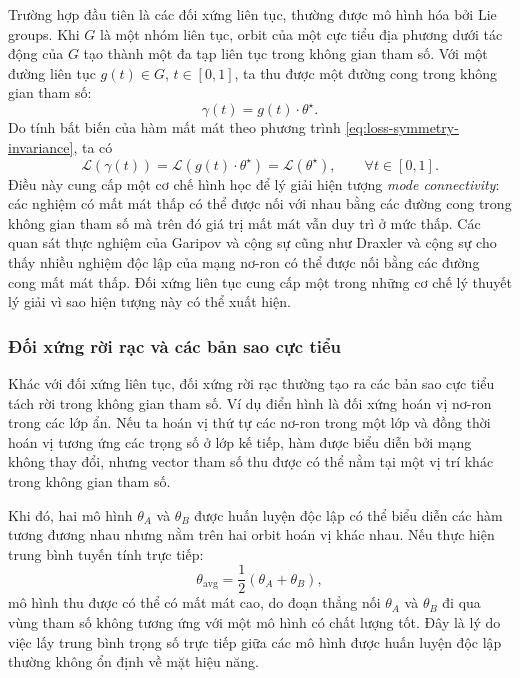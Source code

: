 Trường hợp đầu tiên là các đối xứng liên tục, thường được mô hình hóa bởi Lie groups. Khi $G$ là một nhóm liên tục, orbit của một cực tiểu địa phương dưới tác động của $G$ tạo thành một đa tạp liên tục trong không gian tham số. Với một đường liên tục $g(t) \in G$, $t \in [0,1]$, ta thu được một đường cong trong không gian tham số:
\begin{equation}
    \gamma(t) = g(t) \cdot \theta^\star.
    \label{eq:continuous-symmetry-path}
\end{equation}
Do tính bất biến của hàm mất mát theo phương trình \eqref{eq:loss-symmetry-invariance}, ta có
\begin{equation}
    \mathcal{L}(\gamma(t))
    =
    \mathcal{L}(g(t) \cdot \theta^\star)
    =
    \mathcal{L}(\theta^\star),
    \qquad \forall t \in [0,1].
    \label{eq:constant-loss-path}
\end{equation}
Điều này cung cấp một cơ chế hình học để lý giải hiện tượng \textit{mode connectivity}: các nghiệm có mất mát thấp có thể được nối với nhau bằng các đường cong trong không gian tham số mà trên đó giá trị mất mát vẫn duy trì ở mức thấp. Các quan sát thực nghiệm của Garipov và cộng sự \cite{garipov2018loss} cũng như Draxler và cộng sự \cite{draxler2018essentially} cho thấy nhiều nghiệm độc lập của mạng nơ-ron có thể được nối bằng các đường cong mất mát thấp. Đối xứng liên tục cung cấp một trong những cơ chế lý thuyết lý giải vì sao hiện tượng này có thể xuất hiện.

\subsubsection{Đối xứng rời rạc và các bản sao cực tiểu}

Khác với đối xứng liên tục, đối xứng rời rạc thường tạo ra các bản sao cực tiểu tách rời trong không gian tham số. Ví dụ điển hình là đối xứng hoán vị nơ-ron trong các lớp ẩn. Nếu ta hoán vị thứ tự các nơ-ron trong một lớp và đồng thời hoán vị tương ứng các trọng số ở lớp kế tiếp, hàm được biểu diễn bởi mạng không thay đổi, nhưng vector tham số thu được có thể nằm tại một vị trí khác trong không gian tham số.

Khi đó, hai mô hình $\theta_A$ và $\theta_B$ được huấn luyện độc lập có thể biểu diễn các hàm tương đương nhau nhưng nằm trên hai orbit hoán vị khác nhau. Nếu thực hiện trung bình tuyến tính trực tiếp:
\begin{equation}
    \theta_{\mathrm{avg}}
    =
    \frac{1}{2}(\theta_A + \theta_B),
    \label{eq:naive-weight-averaging}
\end{equation}
mô hình thu được có thể có mất mát cao, do đoạn thẳng nối $\theta_A$ và $\theta_B$ đi qua vùng tham số không tương ứng với một mô hình có chất lượng tốt. Đây là lý do việc lấy trung bình trọng số trực tiếp giữa các mô hình được huấn luyện độc lập thường không ổn định về mặt hiệu năng.

